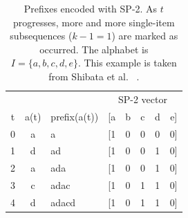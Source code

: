 \begin{table}[!htb]
    \centering
    \begin{tabular}{cclccccc}
        \hline
          &      &              & \multicolumn{5}{c}{SP-2 vector}\\
        t & a(t) & prefix(a(t)) & [a & b & c & d & e]\\
        \hline
        0 & a    & a            & [1 & 0 & 0 & 0 & 0]\\
        1 & d    & ad           & [1 & 0 & 0 & 1 & 0]\\
        2 & a    & ada          & [1 & 0 & 0 & 1 & 0]\\
        3 & c    & adac         & [1 & 0 & 1 & 1 & 0]\\
        4 & d    & adacd        & [1 & 0 & 1 & 1 & 0]\\
        \hline
    \end{tabular}
    \caption[SP-2 feature vector example]{Prefixes encoded with SP-2. As $t$ progresses, more and more single-item subsequences ($k-1=1$) are marked as occurred. The alphabet is $I=\{a,b,c,d,e\}$. This example is taken from Shibata et al. ~\cite{shibata2016bipartite}.}
    \label{tab:sp2-encoding}
\end{table}
